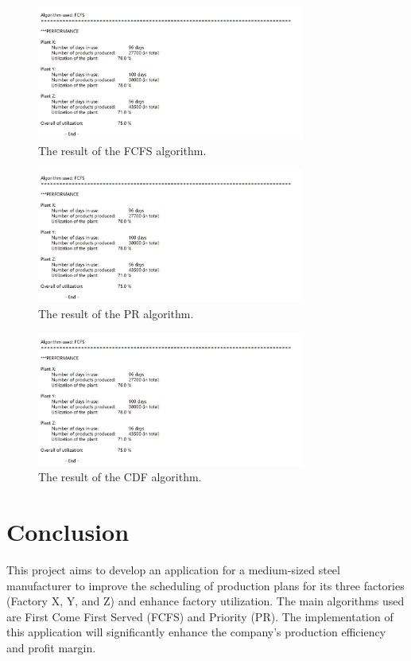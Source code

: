 \documentclass{ieeeaccess}
\begin{document}
\begin{figure}[h]
    \centering
    \includegraphics[width=88mm]{image/1.png}
    \caption{The result of the FCFS algorithm.}
    \label{FCFS}
\end{figure}

\begin{figure}[h]
    \centering
    \includegraphics[width=88mm]{image/1.png}
    \caption{The result of the PR algorithm.}
    \label{PR}
\end{figure}

\begin{figure}[h]
    \centering
    \includegraphics[width=88mm]{image/1.png}
    \caption{The result of the CDF algorithm.}
    \label{CDF}
\end{figure}

\section{Conclusion}
This project aims to develop an application for a medium-sized steel manufacturer to improve the scheduling of production plans for its three factories (Factory X, Y, and Z) and enhance factory utilization. The main algorithms used are First Come First Served (FCFS) and Priority (PR). The implementation of this application will significantly enhance the company's production efficiency and profit margin.
\end{document}
